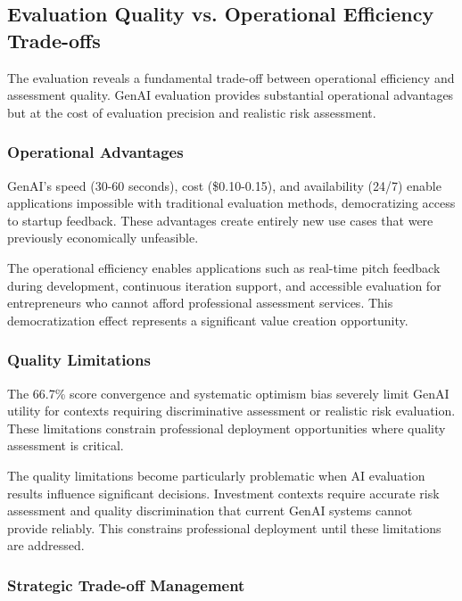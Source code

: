 \subsection{Evaluation Quality vs. Operational Efficiency Trade-offs}
\label{sec:tradeoffs}

The evaluation reveals a fundamental trade-off between operational efficiency and assessment quality. GenAI evaluation provides substantial operational advantages but at the cost of evaluation precision and realistic risk assessment.

\subsubsection{Operational Advantages}
\label{subsec:advantages}

GenAI's speed (30-60 seconds), cost (\$0.10-0.15), and availability (24/7) enable applications impossible with traditional evaluation methods, democratizing access to startup feedback. These advantages create entirely new use cases that were previously economically unfeasible.

The operational efficiency enables applications such as real-time pitch feedback during development, continuous iteration support, and accessible evaluation for entrepreneurs who cannot afford professional assessment services. This democratization effect represents a significant value creation opportunity.

\subsubsection{Quality Limitations}
\label{subsec:limitations}

The 66.7\% score convergence and systematic optimism bias severely limit GenAI utility for contexts requiring discriminative assessment or realistic risk evaluation. These limitations constrain professional deployment opportunities where quality assessment is critical.

The quality limitations become particularly problematic when AI evaluation results influence significant decisions. Investment contexts require accurate risk assessment and quality discrimination that current GenAI systems cannot provide reliably. This constrains professional deployment until these limitations are addressed.

\subsubsection{Strategic Trade-off Management}
\label{subsec:strategy}

